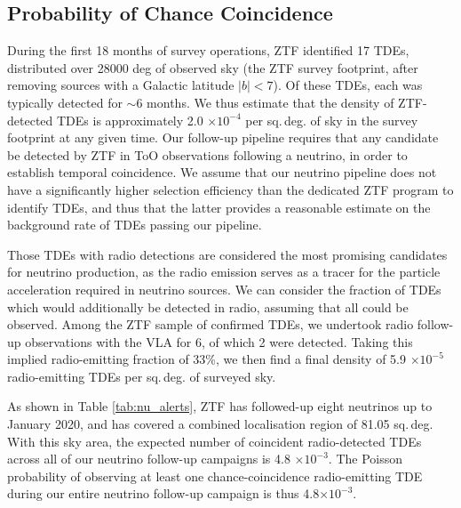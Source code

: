 \documentclass{nature_plusfigure}
\begin{document}
\begin{methods}
\section{Probability of Chance Coincidence}
During the first 18 months of survey operations, ZTF identified 17 TDEs\cite{2020arXiv200101409V}, distributed over 28000 deg of observed sky (the ZTF survey footprint, after removing sources with a Galactic latitude $|b|<7$). Of these TDEs, each was typically detected for $\sim$6 months\cite{2020arXiv200101409V}. We thus estimate that the density of ZTF-detected TDEs is approximately 2.0 $\times 10^{-4}$ per sq.\,deg. of sky in the survey footprint at any given time. Our follow-up pipeline requires that any candidate be detected by ZTF in ToO observations following a neutrino, in order to establish temporal coincidence. We assume that our neutrino pipeline does not have a significantly higher selection efficiency than the dedicated ZTF program to identify TDEs\cite{2020arXiv200101409V}, and thus that the latter provides a reasonable estimate on the background rate of TDEs passing our pipeline.

Those TDEs with radio detections are considered the most promising candidates for neutrino production, as the radio emission serves as a tracer for the particle acceleration required in neutrino sources. We can consider the fraction of TDEs which would additionally be detected in radio, assuming that all could be observed. Among the ZTF sample of confirmed TDEs, we undertook radio follow-up observations with the VLA for 6, of which 2 were detected. Taking this implied radio-emitting fraction of 33\%, we then find a final density of 5.9 $\times 10^{-5}$ radio-emitting TDEs per sq.\,deg. of surveyed sky. 

As shown in Table \ref{tab:nu_alerts}, ZTF has followed-up eight neutrinos up to January 2020, and has covered a combined localisation region of 81.05 sq.\,deg. With this sky area, the expected number of coincident radio-detected TDEs across all of our neutrino follow-up campaigns is 4.8 $\times 10^{-3}$. The Poisson probability of observing at least one chance-coincidence radio-emitting TDE during our entire neutrino follow-up campaign is thus 4.8$ \times 10^{-3}$. 


\end{methods}
\end{document}
